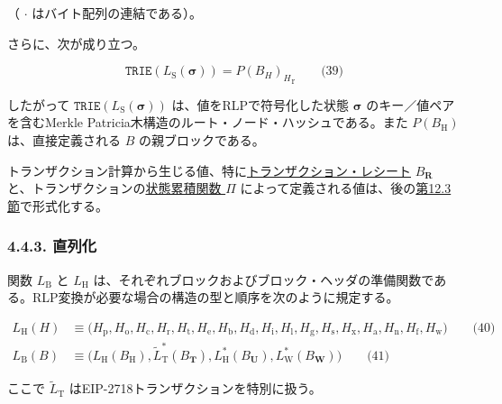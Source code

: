 \documentclass[
]{ltjsarticle}
\begin{document}
（ \(\cdot\) はバイト配列の連結である）。

さらに、次が成り立つ。

\protect\hypertarget{eq-39}{}{}

\[\mathtt{TRIE}(L_{\mathrm{S}}(\boldsymbol{\sigma})) = {P(B_H)_H}_{\mathrm{r}} \qquad \text{(39)}\]

したがって \(\texttt{TRIE}(L_{\mathrm{S}}(\boldsymbol{\sigma}))\)
は、値をRLPで符号化した状態 \(\boldsymbol{\sigma}\)
のキー／値ペアを含むMerkle
Patricia木構造のルート・ノード・ハッシュである。また
\(P(B_{\mathrm{H}})\) は、直接定義される \(B\) の親ブロックである。

トランザクション計算から生じる値、特に\protect\hyperlink{Transaction_Receipt}{トランザクション・レシート}
\(B_{\mathbf{R}}\)
と、トランザクションの\protect\hyperlink{Pi}{状態累積関数 \(\Pi\)}
によって定義される値は、後の\protect\hyperlink{sec:statenoncevalidation}{第12.3節}で形式化する。

\hypertarget{ux76f4ux5217ux5316}{%
\subsubsection{4.4.3. 直列化}\label{ux76f4ux5217ux5316}}

\hypertarget{block_preparation_function_for_RLP_serialization_L__B}{}

\protect\hypertarget{block_preparation_function_for_RLP_serialization_L__H}{}{}関数
\(L_{\mathrm{B}}\) と \(L_{\mathrm{H}}\)
は、それぞれブロックおよびブロック・ヘッダの準備関数である。RLP変換が必要な場合の構造の型と順序を次のように規定する。

\protect\hypertarget{eq-40}{}{}\protect\hypertarget{eq-41}{}{}

\[\begin{aligned}
L_{\mathrm{H}}(H) &\equiv \big(H_{\mathrm{p}}, H_{\mathrm{o}}, H_{\mathrm{c}}, H_{\mathrm{r}}, H_{\mathrm{t}}, H_{\mathrm{e}}, H_{\mathrm{b}}, H_{\mathrm{d}},
  H_{\mathrm{i}}, H_{\mathrm{l}}, H_{\mathrm{g}}, H_{\mathrm{s}}, H_{\mathrm{x}}, H_{\mathrm{a}}, H_{\mathrm{n}}, H_{\mathrm{f}}, H_{\mathrm{w}}\big)
  \qquad \text{(40)} \\
L_{\mathrm{B}}(B) &\equiv \big(L_{\mathrm{H}}(B_{\mathrm{H}}), \widetilde{L}_{\mathrm{T}}^{*}(B_{\mathbf{T}}),
  L_{\mathrm{H}}^{*}(B_{\mathbf{U}}), L_{\mathrm{W}}^{*}(B_{\mathbf{W}})\big) \qquad \text{(41)}
\end{aligned}\]

ここで \(\widetilde{L}_{\mathrm{T}}\)
はEIP-2718トランザクションを特別に扱う。
\end{document}
